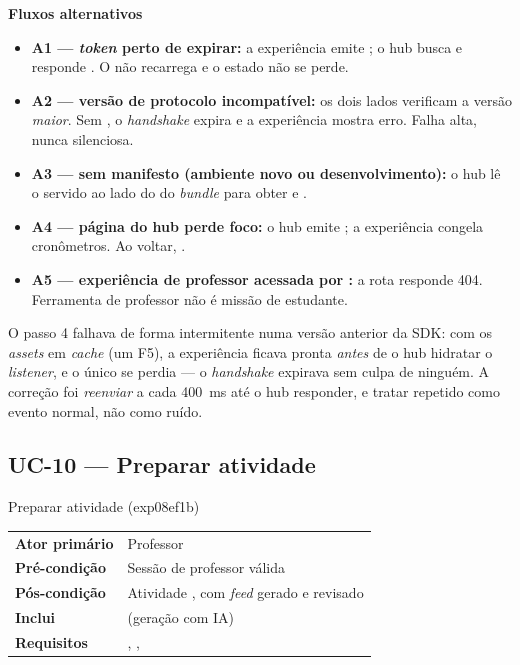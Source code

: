 \textbf{Fluxos alternativos}
\begin{itemize}
  \item \textbf{A1 --- \emph{token} perto de expirar:} a experiência emite
    ; o hub busca  e responde
    . O  não recarrega e o estado não se perde.
  \item \textbf{A2 --- versão de protocolo incompatível:} os dois lados
    verificam a versão \emph{maior}. Sem , o
    \emph{handshake} expira e a experiência mostra erro. Falha alta, nunca
    silenciosa.
  \item \textbf{A3 --- sem manifesto (ambiente novo ou desenvolvimento):} o hub
    lê o  servido ao lado do  do
    \emph{bundle} para obter  e .
  \item \textbf{A4 --- página do hub perde foco:} o hub emite ; a
    experiência congela cronômetros. Ao voltar, .
  \item \textbf{A5 --- experiência de professor acessada por :}
    a rota responde 404. Ferramenta de professor não é missão de estudante.
\end{itemize}

\begin{atencao}
O passo 4 falhava de forma intermitente numa versão anterior da SDK: com os
\emph{assets} em \emph{cache} (um F5), a experiência ficava pronta \emph{antes}
de o hub hidratar o \emph{listener}, e o único  se perdia --- o
\emph{handshake} expirava sem culpa de ninguém. A correção foi \emph{reenviar}
 a cada \SI{400}{\milli\second} até o hub responder, e tratar
 repetido como evento normal, não como ruído.
\end{atencao}

\subsection{UC-10 --- Preparar atividade}

\begin{especificacao}{ Preparar atividade (exp08ef1b)}
\begin{tabularx}{\linewidth}{@{}L{28mm}X@{}}
\textbf{Ator primário} & Professor\\
\textbf{Pré-condição} & Sessão de professor válida\\
\textbf{Pós-condição} & Atividade , com \emph{feed} gerado e revisado\\
\textbf{Inclui} &  (geração com IA)\\
\textbf{Requisitos} & , , \\
\end{tabularx}
\end{especificacao}

